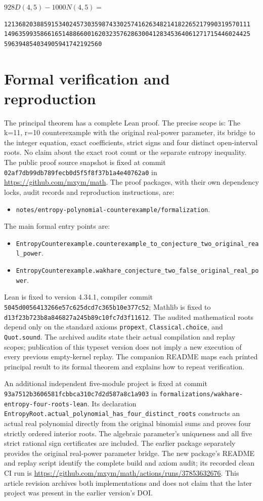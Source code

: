 \documentclass[11pt]{article}
\begin{document}
\noindent $928D(4,5)-1000N(4,5)=$
\begin{Verbatim}[fontsize=\footnotesize]
12136820388591534024573035987433025741626348214182265217990319570111
14963599358661651488660016203235762863004128345364061271715446024425
596394854034905941742192560
\end{Verbatim}

\section{Formal verification and reproduction}
The principal theorem has a complete Lean proof. The precise scope is:
The k=11, r=10 counterexample with the original real-power parameter, its bridge to the integer equation, exact coefficients, strict signs and four distinct open-interval roots. No claim about the exact root count or the separate entropy inequality.
The public proof source snapshot is fixed at commit
\nolinkurl{02af7db99db789fecb0d5f5f8f37b1a4e40762a0} in \url{https://github.com/mxym/math}.
The proof packages, with their own dependency locks, audit records and
reproduction instructions, are:
\begin{itemize}
\item \nolinkurl{notes/entropy-polynomial-counterexample/formalization}.
\end{itemize}
The main formal entry points are:
\begin{itemize}
\item \nolinkurl{EntropyCounterexample.counterexample_to_conjecture_two_original_real_power}.
\item \nolinkurl{EntropyCounterexample.wakhare_conjecture_two_false_original_real_power}.
\end{itemize}
Lean is fixed to version 4.34.1, compiler commit
\nolinkurl{5045d0056413266e57c625dcd7c365b10e377c52}; Mathlib is fixed to
\nolinkurl{d13f23b723b8a846827a245b89c10fc7d3f11612}.
The audited mathematical roots depend only on the standard axioms
\texttt{propext}, \texttt{Classical.choice}, and \texttt{Quot.sound}.
The archived audits state their actual compilation and replay scopes;
publication of this typeset version does not imply a new execution of every
previous empty-kernel replay. The companion README maps each printed
principal result to its formal theorem and explains how to repeat verification.

An additional independent five-module project is fixed at commit
\nolinkurl{93a7512b3606581fcbbca310c7d2d587a8c1a903} in
\nolinkurl{formalizations/wakhare-entropy-four-roots-lean}.
Its declaration
\nolinkurl{EntropyRoot.actual_polynomial_has_four_distinct_roots}
constructs an actual real polynomial directly from the original binomial
sums and proves four strictly ordered interior roots. The algebraic
parameter's uniqueness and all five strict rational sign certificates
are included. The earlier package separately provides the original
real-power parameter bridge. The new package's README and replay script
identify the complete build and axiom audit; its recorded clean CI run
is \url{https://github.com/mxym/math/actions/runs/37853632676}.
This article revision archives both implementations and does not claim
that the later project was present in the earlier version's DOI.
\end{document}
